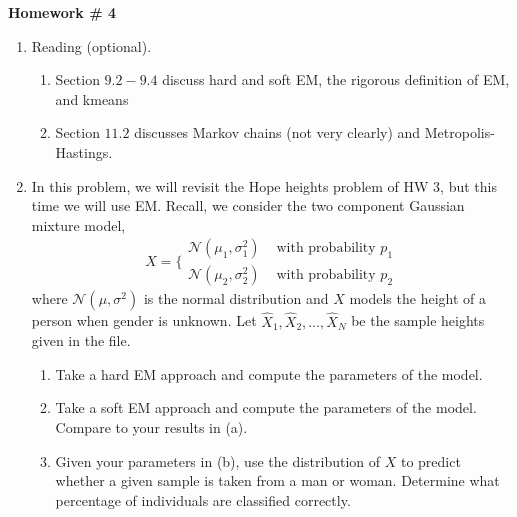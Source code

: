 \documentclass{article}
\begin{document}
\renewcommand{\a}{\textbf{a}}
\renewcommand{\b}{\textbf{b}}
\renewcommand{\d}{\textbf{d}}
\newcommand{\e}{\textbf{e}}

\large

\begin{center}
\textbf{Homework \# 4} \\  
\end{center}

\medskip


\medskip




\begin{enumerate} 

\item Reading (optional).
\begin{enumerate}
\item Section $9.2-9.4$ discuss hard and soft EM, the rigorous definition of EM, and kmeans
\item Section $11.2$ discusses Markov chains (not very clearly) and Metropolis-Hastings.
\end{enumerate}

\item In this problem, we will revisit the Hope heights problem of HW $3$, but this time we will use EM.  Recall, we consider the two component Gaussian mixture model,
\begin{equation}
X = \bigg\{
\begin{array}{cc}
\mathcal{N}(\mu_1, \sigma_1^2) & \text{ with probability } p_1 \\
\mathcal{N}(\mu_2, \sigma_2^2) & \text{ with probability } p_2
\end{array}
\end{equation}
where $\mathcal{N}(\mu, \sigma^2)$ is the normal distribution and $X$ models the height of a person when gender is unknown.  Let $\hat{X}_1, \hat{X}_2,\dots, \hat{X}_N$ be the sample heights given in the file.  
\begin{enumerate}
\item Take a hard EM approach and compute the parameters of the model.
\item Take a soft EM approach and compute the parameters of the model.  Compare to your results in (a).
\item Given your parameters in (b), use the distribution of $X$ to predict whether a given sample is taken from a man or woman.    Determine what percentage of individuals are classified correctly. 
\end{enumerate}


\end{enumerate}
\end{document}
